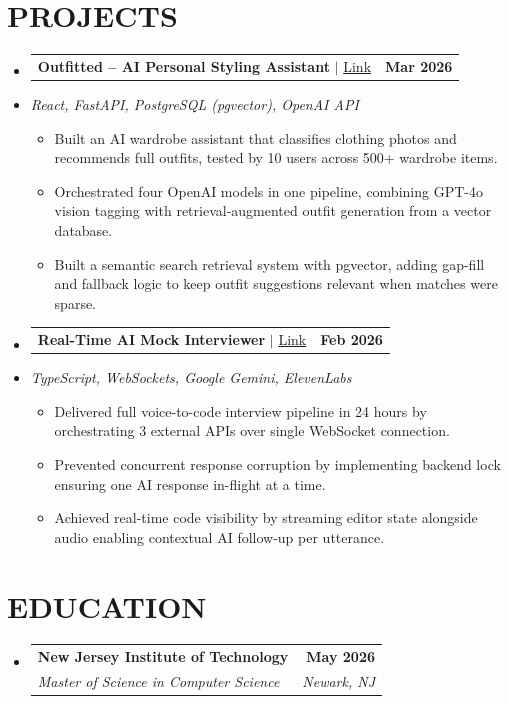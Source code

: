 \documentclass[letterpaper,11pt]{article}
\makeatletter
\newcommand{\resumeItem}[1]{
  \item\small{#1\vspace{-3pt}}
}
\newcommand{\resumeStack}[1]{
  \vspace{1pt}\item\small{\textit{#1}}\vspace{-6pt}
}
\newcommand{\resumeSubheading}[4]{
  \vspace{-3pt}\item
    \begin{tabular*}{1.0\textwidth}[t]{l@{\extracolsep{\fill}}r}
      \textbf{#1} & \textbf{\small #2} \\
      \textit{\small#3} & \textit{\small #4} \\
    \end{tabular*}\vspace{-9pt}
}
\newcommand{\resumeProjectHeading}[2]{
    \item
    \begin{tabular*}{1.001\textwidth}{l@{\extracolsep{\fill}}r}
      \small#1 & \textbf{\small #2}\\
    \end{tabular*}\vspace{-9pt}
}
\newcommand{\resumeItemListStart}{\begin{itemize}[leftmargin=0.15in, label=$\bullet$]}
\newcommand{\resumeItemListEnd}{\end{itemize}\vspace{-7pt}}
\newcommand{\resumeSubHeadingListStart}{\begin{itemize}[leftmargin=0.0in, label={}]}
\newcommand{\resumeSubHeadingListEnd}{\end{itemize}}
\makeatother
\begin{document}
\section{PROJECTS}
\resumeSubHeadingListStart

\resumeProjectHeading
{\textbf{Outfitted -- AI Personal Styling Assistant} $|$ \href{https://github.com/talaviyakhushi/outfitted}{Link}}{Mar 2026}
\vspace{-9pt}
\resumeStack{React, FastAPI, PostgreSQL (pgvector), OpenAI API}
\resumeItemListStart
  \resumeItem{Built an AI wardrobe assistant that classifies clothing photos and recommends full outfits, tested by 10 users across 500+ wardrobe items.}
  \resumeItem{Orchestrated four OpenAI models in one pipeline, combining GPT-4o vision tagging with retrieval-augmented outfit generation from a vector database.}
  \resumeItem{Built a semantic search retrieval system with pgvector, adding gap-fill and fallback logic to keep outfit suggestions relevant when matches were sparse.}
\resumeItemListEnd

\resumeProjectHeading
{\textbf{Real-Time AI Mock Interviewer} $|$ \href{https://github.com/talaviyakhushi}{Link}}{Feb 2026}
\vspace{-9pt}
\resumeStack{TypeScript, WebSockets, Google Gemini, ElevenLabs}
\resumeItemListStart
  \resumeItem{Delivered full voice-to-code interview pipeline in 24 hours by orchestrating 3 external APIs over single WebSocket connection.}
  \resumeItem{Prevented concurrent response corruption by implementing backend lock ensuring one AI response in-flight at a time.}
  \resumeItem{Achieved real-time code visibility by streaming editor state alongside audio enabling contextual AI follow-up per utterance.}
\resumeItemListEnd

\resumeSubHeadingListEnd
\vspace{-3pt}
\section{EDUCATION}
\vspace{1pt}
\resumeSubHeadingListStart
\vspace{5pt}
\resumeSubheading
{New Jersey Institute of Technology}{May 2026}
{Master of Science in Computer Science}{Newark, NJ}
\resumeSubHeadingListEnd
\end{document}
